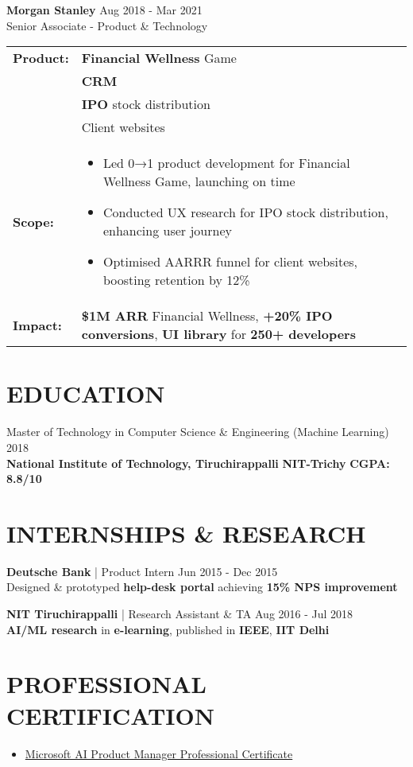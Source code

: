 \documentclass[10pt,a4paper]{article}
\newcommand{\experienceitem}[4]{
    #1 \hfill #2 \\
    #3 \hfill \textit{#4}
}
\newcommand{\educationitem}[4]{
    #1 \hfill #2 \\
    #3 \hfill #4
}
\begin{document}
\experienceitem{\textbf{Morgan Stanley}}{Aug 2018 - Mar 2021}{Senior Associate - Product \& Technology}{}

{\renewcommand{\arraystretch}{1.2}
\begin{tabularx}{\textwidth}{|>{\raggedright\arraybackslash}p{1.8cm}|X|}
\hline
\textbf{Product:} & \textbf{Financial Wellness} Game \\ & \textbf{CRM} \\ & \textbf{IPO} stock distribution \\ & Client websites \\ \hline
\textbf{Scope:} & \begin{itemize}[leftmargin=*,nosep]
    \item Led 0→1 product development for Financial Wellness Game, launching on time
    \item Conducted UX research for IPO stock distribution, enhancing user journey
    \item Optimised AARRR funnel for client websites, boosting retention by 12\%
\end{itemize} \\ \hline
\textbf{Impact:} & \textbf{\$1M ARR} Financial Wellness, \textbf{+20\% IPO conversions}, \textbf{UI library} for \textbf{250+ developers} \\ \hline
\end{tabularx}}

\section{EDUCATION}

\educationitem{Master of Technology in Computer Science \& Engineering (Machine Learning)}{ 2018}{\textbf{National Institute of Technology, Tiruchirappalli} \textbf{NIT-Trichy}}{\textbf{CGPA: 8.8/10}}

\section{INTERNSHIPS \& RESEARCH}

\textbf{Deutsche Bank} | Product Intern \hfill Jun 2015 - Dec 2015 \\
Designed \& prototyped \textbf{help-desk portal} achieving \textbf{15\% NPS improvement}

\textbf{NIT Tiruchirappalli} | Research Assistant \& TA \hfill Aug 2016 - Jul 2018 \\
\textbf{AI/ML research} in \textbf{e-learning}, published in \textbf{IEEE}, \textbf{IIT Delhi}

\section{PROFESSIONAL CERTIFICATION}

\begin{itemize}[leftmargin=*]
    \item \href{https://www.coursera.org/account/accomplishments/specialization/VEVUE3HVB14I}{\textcolor{blue!70!black}{Microsoft AI Product Manager Professional Certificate}}
\end{itemize}
\end{document}
